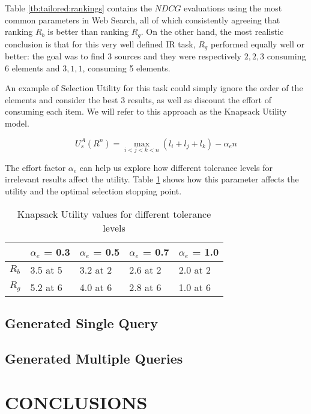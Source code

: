 \documentclass[a4paper, 10pt, conference]{ieeeconf}
\begin{document}
Table \ref{tb:tailored:rankings} contains the $NDCG$ evaluations using the most
common parameters in Web Search, all of which consistently agreeing that ranking
$R_b$ is better than ranking $R_g$. On the other hand, the most realistic
conclusion is that for this very well defined IR task, $R_g$ performed equally
well or better: the goal was to find 3 sources and they were respectively
$2,2,3$ consuming 6 elements and $3,1,1$, consuming 5 elements.

An example of Selection Utility for this task could simply ignore the order of
the elements and consider the best 3 results, as well as discount the effort of
consuming each item. We will refer to this approach as the Knapsack Utility
model.

\begin{equation}
\label{eq:tailored:utility}
U_s^A(R^n) = \max_{i<j<k<n}(l_i+l_j+l_k) - \alpha_e n
\end{equation}

The effort factor $\alpha_e$ can help us explore how different tolerance levels
for irrelevant results affect the utility. Table \ref{tb:tailored:tuning} shows
how this parameter affects the utility and the optimal selection stopping point.

\begin{table}
\label{tb:tailored:tuning}
\centering
\caption{Knapsack Utility values for different tolerance levels}
\begin{tabular}{l|l|l|l|l|}
\cline{2-5}
    & $\alpha_e$ = 0.3 & $\alpha_e$ = 0.5 & $\alpha_e$ = 0.7 & $\alpha_e$ = 1.0 \\
\hline \multicolumn{1}{|l|}{$R_b$}
    & 3.5 at 5 & 3.2 at 2 & 2.6 at 2 & 2.0 at 2  \\
\hline \multicolumn{1}{|l|}{$R_g$}
    & 5.2 at 6 & 4.0 at 6 & 2.8 at 6 & 1.0 at 6  \\
\hline
\end{tabular}
\end{table}

\subsection{Generated Single Query}

\subsection{Generated Multiple Queries}

\section{CONCLUSIONS}
\end{document}
